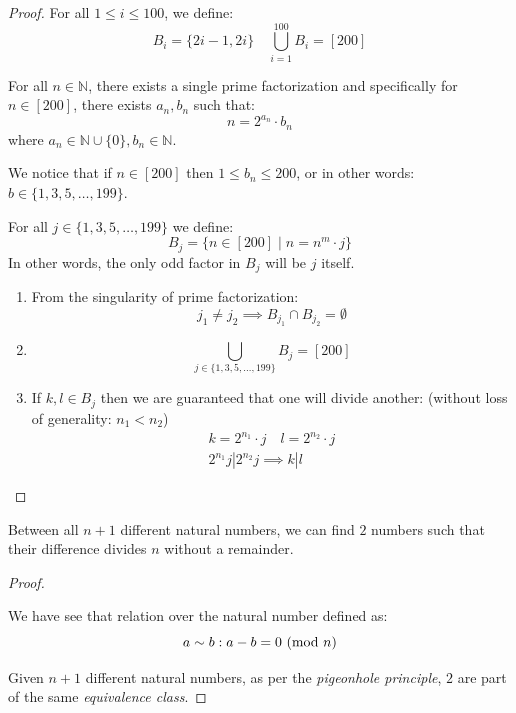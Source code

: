 \documentclass[00_complete]{subfiles}
\begin{document}
\begin{proof}
    For all $1 \leq i \leq 100$, we define:
    $$B_i=\{2i-1,2i\} \quad \bigcup_{i=1}^{100}B_i=[200]$$
    \begin{reminder}
        For all $n \in \mathbb{N}$, there exists a single prime factorization
        and specifically for $n \in [200]$, there exists $a_n,b_n$ such that:
        $$n=2^{a_n}\cdot b_n$$
        where $a_n \in \mathbb{N} \cup \{0\}, b_n \in \mathbb{N}$.
    \end{reminder}
        We notice that if $n \in [200]$ then $1 \leq b_n \leq 200$, or in other
        words: $b \in \{1,3,5,\dots,199\}$.

        For all $j \in \{1,3,5,\dots,199\}$ we define:
        $$B_j = \{n \in [200] \mid n=n^m \cdot j\}$$
        In other words, the only odd factor in $B_j$ will be $j$ itself.
        \begin{enumerate}
            \item From the singularity of prime factorization:
                $$j_1 \neq j_2 \implies B_{j_1}\cap B_{j_2}=\emptyset$$
            \item
                $$\bigcup_{j \in \{1,3,5,\dots,199\}}B_j=[200]$$
            \item If $k,l \in B_j$ then we are guaranteed that one will divide
                another: (without loss of generality: $n_1 < n_2$)
                \begin{gather*}
                    k=2^{n_1}\cdot j \quad l=2^{n_2} \cdot j \\
                    2^{n_1}j|2^{n_2}j \implies k|l
                \end{gather*}
        \end{enumerate}
\end{proof}

\begin{claim}
    Between all $n+1$ different natural numbers, we can find $2$ numbers such that
    their difference divides $n$ without a remainder.
\end{claim}

\begin{proof}
    \begin{reminder}
        We have see that relation over the natural number defined as:
        $$a \sim b: a-b=0\ (\mathrm{mod}\ n)$$
    \end{reminder}
    Given $n+1$ different natural numbers, as per the \emph{pigeonhole
    principle}, $2$ are part of the same \emph{equivalence class}.
\end{proof}
\end{document}
